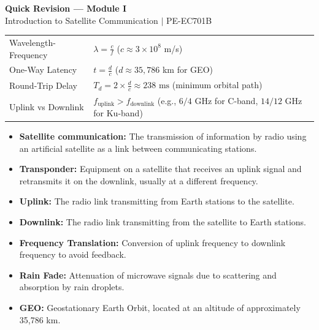 \documentclass[12pt,a4paper]{article}
\renewcommand{\arraystretch}{1.45}
\begin{document}
\newpage
\begin{center}
  {\large\bfseries\color{myred} Quick Revision --- Module I}\\[3pt]
  {\small\color{mydark} Introduction to Satellite Communication $|$ PE-EC701B}
\end{center}
\noindent{\color{myred}\rule{\linewidth}{1.2pt}}
\vspace{4pt}

\begin{tcolorbox}[formulabox, title={\textbf{Key Formulas at a Glance}}]
\renewcommand{\arraystretch}{1.3}
\begin{tabularx}{\linewidth}{B{4.5cm} X}Wavelength-Frequency & $\lambda = \frac{c}{f}$ \quad ($c \approx 3 \times 10^8$ m/s) \\[6pt]
One-Way Latency & $t = \frac{d}{c}$ \quad ($d \approx 35,786$ km for GEO) \\[6pt]
Round-Trip Delay & $T_d = 2 \times \frac{d}{c} \approx 238 \text{ ms}$ (minimum orbital path) \\[6pt]
Uplink vs Downlink & $f_{\text{uplink}} > f_{\text{downlink}}$ \quad (e.g., $6/4$ GHz for C-band, $14/12$ GHz for Ku-band)
\end{tabularx}
\end{tcolorbox}

\begin{tcolorbox}[defbox, title={\textbf{One-Line Definitions}}]
\begin{itemize}[leftmargin=*, itemsep=2.5pt, topsep=0pt]
  \item \textbf{Satellite communication:} The transmission of information by radio using an artificial satellite as a link between communicating stations.
  \item \textbf{Transponder:} Equipment on a satellite that receives an uplink signal and retransmits it on the downlink, usually at a different frequency.
  \item \textbf{Uplink:} The radio link transmitting from Earth stations to the satellite.
  \item \textbf{Downlink:} The radio link transmitting from the satellite to Earth stations.
  \item \textbf{Frequency Translation:} Conversion of uplink frequency to downlink frequency to avoid feedback.
  \item \textbf{Rain Fade:} Attenuation of microwave signals due to scattering and absorption by rain droplets.
  \item \textbf{GEO:} Geostationary Earth Orbit, located at an altitude of approximately 35,786 km.
\end{itemize}
\end{tcolorbox}
\end{document}

